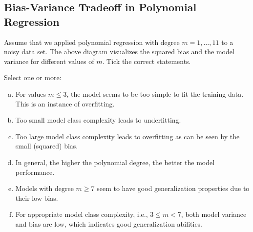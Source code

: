 \documentclass{article}
\begin{document}
\subsection*{Bias-Variance Tradeoff in Polynomial Regression}

\begin{center}
\end{center}
Assume that we applied polynomial regression with degree \(m = 1, \ldots, 11\) to a noisy data set. The above diagram visualizes the squared bias and the model variance for different values of \(m\). Tick the correct statements.

Select one or more:

\begin{enumerate}[(a)]
    \item For values \(m \leq 3\), the model seems to be too simple to fit the training data. This is an instance of overfitting.
    \item Too small model class complexity leads to underfitting.
    \item Too large model class complexity leads to overfitting as can be seen by the small (squared) bias.
    \item In general, the higher the polynomial degree, the better the model performance.
    \item Models with degree \(m \geq 7\) seem to have good generalization properties due to their low bias.
    \item For appropriate model class complexity, i.e., \(3 \leq m < 7\), both model variance and bias are low, which indicates good generalization abilities.
\end{enumerate}
\end{document}
